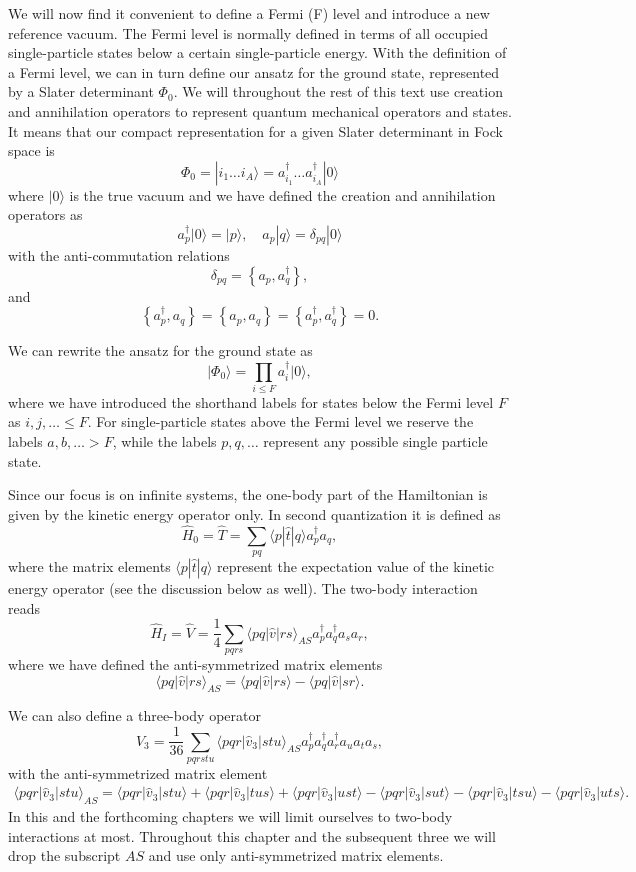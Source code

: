 We will now find it convenient to define a Fermi (F) level and introduce a
new reference vacuum. The Fermi level is normally  defined in terms of all
occupied single-particle states below a certain
single-particle energy.  With the definition of a Fermi level, we can
in turn define our ansatz for the ground state, represented by a
Slater determinant $\Phi_0$.  We will throughout the rest of this
text use creation and annihilation operators to represent quantum
mechanical operators and states.  It means that our compact
representation for a given Slater determinant in Fock space is
\[
  \Phi_{0}=|i_1 \dots i_A\rangle= a_{i_1}^{\dagger} \dots
  a_{i_A}^{\dagger} |0\rangle
\]
where $\vert 0\rangle$ is the true vacuum and we have defined the
creation and annihilation operators as
    \[
        a_p^\dagger|0\rangle = |p\rangle, \quad a_p |q\rangle =
        \delta_{pq}|0\rangle
    \]
with the anti-commutation relations
\[
  \delta_{pq} = \left\{a_p, a_q^\dagger \right\},
\]
and
\[
\left\{a_p^\dagger, a_q \right\} = \left\{a_p, a_q \right\} =
\left\{a_p^\dagger, a_q^\dagger \right\}=0.
\]

We can rewrite the ansatz for the ground state as
\[
\vert\Phi_0\rangle = \prod_{i\le F}a_{i}^{\dagger} |0\rangle,
\]
where we have introduced the shorthand labels for states below the
Fermi level $F$ as $i,j,\ldots \leq F$. For single-particle states
above the Fermi level we reserve the labels $a,b,\ldots > F$, while
the labels $p,q, \ldots$ represent any possible single particle state.


Since our focus is on infinite systems, the one-body part of the
Hamiltonian is given by the kinetic energy operator only.  In second
quantization it is defined as
\[
\hat{H}_0=\hat{T} = \sum_{pq} \langle p|\hat{t}|q\rangle a_p^\dagger
a_q,
\]
where the matrix elements $\langle p|\hat{t}|q\rangle$ represent the expectation value of the kinetic energy operator (see the discussion below as well).  The two-body interaction reads
\[
\hat{H}_I=\hat{V} = \frac{1}{4} \sum_{pqrs} \langle
pq|\hat{v}|rs\rangle_{AS} a_p^\dagger a_q^\dagger a_s a_r,
\]
where we have defined the anti-symmetrized matrix elements
\[
\langle pq|\hat{v}|rs\rangle_{AS} = \langle pq|\hat{v}|rs\rangle -
\langle pq|\hat{v}|sr\rangle.
\]

We can also define a three-body operator
\[
\hat{V}_3 = \frac{1}{36} \sum_{pqrstu} \langle
pqr|\hat{v}_3|stu\rangle_{AS} a_p^\dagger a_q^\dagger a_r^\dagger a_u
a_t a_s,
\]
with the anti-symmetrized matrix element
\begin{align}
            \langle pqr|\hat{v}_3|stu\rangle_{AS} = \langle
            pqr|\hat{v}_3|stu\rangle + \langle
            pqr|\hat{v}_3|tus\rangle + \langle
            pqr|\hat{v}_3|ust\rangle- \langle pqr|\hat{v}_3|sut\rangle
            - \langle pqr|\hat{v}_3|tsu\rangle - \langle
            pqr|\hat{v}_3|uts\rangle.
\end{align}
In this and the forthcoming chapters we will limit ourselves to
two-body interactions at most.  Throughout this chapter and the subsequent three we will drop the subscript $AS$ and use only anti-symmetrized matrix elements.

